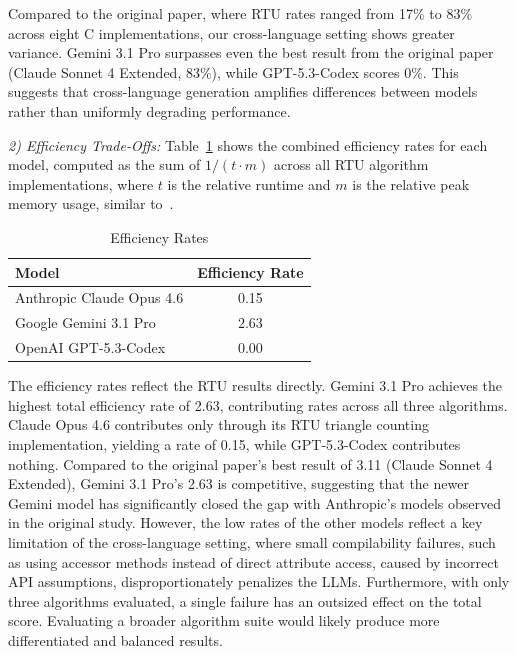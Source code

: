 Compared to the original paper, where RTU rates ranged from 17\% to 83\% across eight C implementations, our cross-language setting shows greater variance. Gemini 3.1 Pro surpasses even the best result from the original paper (Claude Sonnet 4 Extended, 83\%), while GPT-5.3-Codex scores 0\%. This suggests that cross-language generation amplifies differences between models rather than uniformly degrading performance.

\textit{2) Efficiency Trade-Offs:} Table~\ref{tab:efficiency} shows the combined efficiency rates for each model, computed as the sum of $1/(t \cdot m)$ across all RTU algorithm implementations, where $t$ is the relative runtime and $m$ is the relative peak memory usage, similar to~\cite{llmgen2025}.

\vspace{-1em}

\begin{table}[h]
\centering
\caption{Efficiency Rates}
\vspace{0.5em}
\label{tab:efficiency}
\begin{tabular}{lc}
\toprule
Model & Efficiency Rate \\
\midrule
Anthropic Claude Opus 4.6 & 0.15 \\
Google Gemini 3.1 Pro & $\mathbf{2.63}$ \\
OpenAI GPT-5.3-Codex & 0.00 \\
\bottomrule
\end{tabular}
\end{table}

The efficiency rates reflect the RTU results directly. Gemini 3.1 Pro achieves the highest total efficiency rate of 2.63, contributing rates across all three algorithms. Claude Opus 4.6 contributes only through its RTU triangle counting implementation, yielding a rate of 0.15, while GPT-5.3-Codex contributes nothing. Compared to the original paper's best result of 3.11 (Claude Sonnet 4 Extended), Gemini 3.1 Pro's 2.63 is competitive, suggesting that the newer Gemini model has significantly closed the gap with Anthropic's models observed in the original study. However, the low rates of the other models reflect a key limitation of the cross-language setting, where small compilability failures, such as using accessor methods instead of direct attribute access, caused by incorrect API assumptions, disproportionately penalizes the LLMs. Furthermore, with only three algorithms evaluated, a single failure has an outsized effect on the total score. Evaluating a broader algorithm suite would likely produce more differentiated and balanced results.

